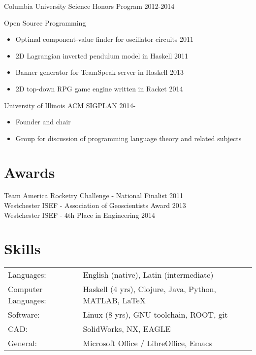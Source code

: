 \documentclass[margin]{res}
\begin{document}
\begin{resume}
Columbia University Science Honors Program \hfill 2012-2014

Open Source Programming
  \begin{itemize} \itemsep -2pt
    \item Optimal component-value finder for oscillator circuits \hfill 2011
    \item 2D Lagrangian inverted pendulum model in Haskell \hfill 2011
    \item Banner generator for TeamSpeak server in Haskell \hfill 2013
    \item 2D top-down RPG game engine written in Racket \hfill 2014
  \end{itemize}

University of Illinois ACM SIGPLAN \hfill 2014-
  \begin{itemize} \itemsep -2pt
    \item Founder and chair
    \item Group for discussion of programming language theory and related subjects
  \end{itemize}
            
\section{Awards} 
Team America Rocketry Challenge - National Finalist \hfill 2011 \\
Westchester ISEF - Association of Geoscientists Award \hfill 2013 \\
Westchester ISEF - 4th Place in Engineering \hfill 2014 \\

\section{Skills}
  \begin{tabular}{l p{4in}} \\
    Languages: & English (native), Latin (intermediate) \\
    Computer Languages: & Haskell (4 yrs), Clojure, Java, Python, MATLAB, \LaTeX \\
    Software: & Linux (8 yrs), GNU toolchain, ROOT, git \\
    CAD: & SolidWorks, NX, EAGLE \\
    General: & Microsoft Office / LibreOffice, Emacs
  \end{tabular}

\newpage


\end{resume}
\end{document}
